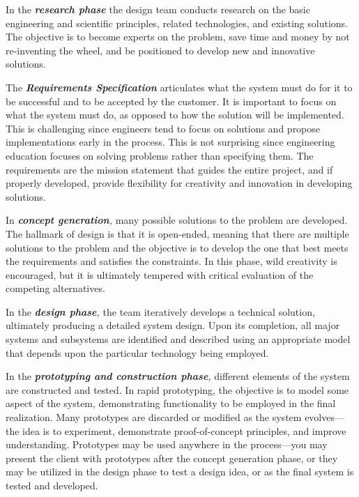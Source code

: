 In the \emph{\textbf{research phase}} the design team conducts research
on the basic engineering and scientific principles, related
technologies, and existing solutions. The objective is to become experts
on the problem, save time and money by not re-inventing the wheel, and
be positioned to develop new and innovative solutions.

The \emph{\textbf{Requirements Specification}} articulates what the
system must do for it to be successful and to be accepted by the
customer. It is important to focus on what the system must do, as
opposed to how the solution will be implemented. This is challenging
since engineers tend to focus on solutions and propose implementations
early in the process. This is not surprising since engineering education
focuses on solving problems rather than specifying them. The
requirements are the mission statement that guides the entire project,
and if properly developed, provide flexibility for creativity and
innovation in developing solutions.

In \emph{\textbf{concept generation},} many possible solutions to the
problem are developed. The hallmark of design is that it is open-ended,
meaning that there are multiple solutions to the problem and the
objective is to develop the one that best meets the requirements and
satisfies the constraints. In this phase, wild creativity is encouraged,
but it is ultimately tempered with critical evaluation of the competing
alternatives.

\textbf{\hfill\break
}In the \emph{\textbf{design phase},} the team iteratively develops a
technical solution, ultimately producing a detailed system design. Upon
its completion, all major systems and subsystems are identified and
described using an appropriate model that depends upon the particular
technology being employed.

In the \emph{\textbf{prototyping and construction phase},} different
elements of the system are constructed and tested. In rapid prototyping,
the objective is to model some aspect of the system, demonstrating
functionality to be employed in the final realization. Many prototypes
are discarded or modified as the system evolves---the idea is to
experiment, demonstrate proof-of-concept principles, and improve
understanding. Prototypes may be used anywhere in the process---you may
present the client with prototypes after the concept generation phase,
or they may be utilized in the design phase to test a design idea, or as
the final system is tested and developed.

